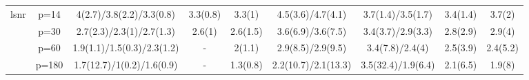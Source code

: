 \begin{table}[ht]
{\begin{tabular}{|c|c|ccccccc|}
  \midrule\multirow{4}[2]{*}{lsnr} & p=14 & 4(2.7)/3.8(2.2)/3.3(0.8) & 3.3(0.8) & 3.3(1) & 4.5(3.6)/4.7(4.1) & 3.7(1.4)/3.5(1.7) & 3.4(1.4) & 3.7(2) \\ 
   & p=30 & 2.7(2.3)/2.3(1)/2.7(1.3) & 2.6(1) & 2.6(1.5) & 3.6(6.9)/3.6(7.5) & 3.4(3.7)/2.9(3.3) & 2.8(2.9) & 2.9(4) \\ 
   & p=60 & 1.9(1.1)/1.5(0.3)/2.3(1.2) & - & 2(1.1) & 2.9(8.5)/2.9(9.5) & 3.4(7.8)/2.4(4) & 2.5(3.9) & 2.4(5.2) \\ 
   & p=180 & 1.7(12.7)/1(0.2)/1.6(0.9) & - & 1.3(0.8) & 2.2(10.7)/2.1(13.3) & 3.5(32.4)/1.9(6.4) & 2.1(6.5) & 1.9(8) \\ 
   \bottomrule 
\end{tabular}
}
\end{table}
